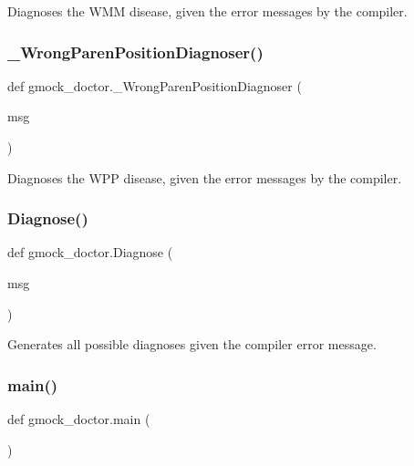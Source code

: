 \begin{DoxyVerb}Diagnoses the WMM disease, given the error messages by the compiler.\end{DoxyVerb}
 \mbox{\label{namespacegmock__doctor_a89b0bfee48942a164f7a4e1e923f3a48}} 
\subsubsection{\texorpdfstring{\_WrongParenPositionDiagnoser()}{\_WrongParenPositionDiagnoser()}}
{\footnotesize\ttfamily def gmock\+\_\+doctor.\+\_\+\+Wrong\+Paren\+Position\+Diagnoser (\begin{DoxyParamCaption}\item[{}]{msg }\end{DoxyParamCaption})\hspace{0.3cm}{\ttfamily [private]}}

\begin{DoxyVerb}Diagnoses the WPP disease, given the error messages by the compiler.\end{DoxyVerb}
 \mbox{\label{namespacegmock__doctor_a8b791ed6679a0135862ebb3e8c27b2b4}} 
\subsubsection{\texorpdfstring{Diagnose()}{Diagnose()}}
{\footnotesize\ttfamily def gmock\+\_\+doctor.\+Diagnose (\begin{DoxyParamCaption}\item[{}]{msg }\end{DoxyParamCaption})}

\begin{DoxyVerb}Generates all possible diagnoses given the compiler error message.\end{DoxyVerb}
 \mbox{\label{namespacegmock__doctor_a6eb6c47cf5a3a7c4266f473c0af6b82f}} 
\subsubsection{\texorpdfstring{main()}{main()}}
{\footnotesize\ttfamily def gmock\+\_\+doctor.\+main (\begin{DoxyParamCaption}{ }\end{DoxyParamCaption})}



